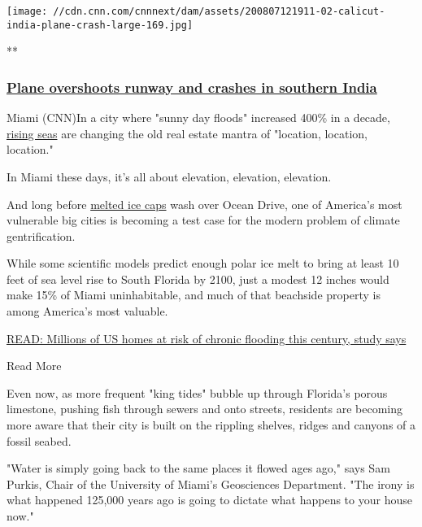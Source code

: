\href{/videos/world/2020/08/07/plane-crash-kozhikode-international-airport-air-india-express-vedika-sud-intl-vpx.cnn/video/playlists/top-news-videos/}{}

\texttt{[image: //cdn.cnn.com/cnnnext/dam/assets/200807121911-02-calicut-india-plane-crash-large-169.jpg]}

**

\hypertarget{plane-overshoots-runway-and-crashes-in-southern-india}{%
\subsubsection{\texorpdfstring{\href{/videos/world/2020/08/07/plane-crash-kozhikode-international-airport-air-india-express-vedika-sud-intl-vpx.cnn/video/playlists/top-news-videos/}{Plane
overshoots runway and crashes in southern
India}}{Plane overshoots runway and crashes in southern India}}\label{plane-overshoots-runway-and-crashes-in-southern-india}}

Miami (CNN)In a city where "sunny day floods" increased 400\% in a
decade,
\href{https://www.cnn.com/2018/06/18/us/sea-level-rise-ucs-projections-wxc/index.html}{rising
seas} are changing the old real estate mantra of "location, location,
location."

In Miami these days, it's all about elevation, elevation, elevation.

And long before
\href{http://www.cnn.com/2019/04/22/world/greenland-sea-level-rise-scn/index.html}{melted
ice caps} wash over Ocean Drive, one of America's most vulnerable big
cities is becoming a test case for the modern problem of climate
gentrification.

While some scientific models predict enough polar ice melt to bring at
least 10 feet of sea level rise to South Florida by 2100, just a modest
12 inches would make 15\% of Miami uninhabitable, and much of that
beachside property is among America's most valuable.

\href{https://www.cnn.com/2018/06/18/us/sea-level-rise-ucs-projections-wxc/index.html}{READ:
Millions of US homes at risk of chronic flooding this century, study
says}

Read More

Even now, as more frequent "king tides" bubble up through Florida's
porous limestone, pushing fish through sewers and onto streets,
residents are becoming more aware that their city is built on the
rippling shelves, ridges and canyons of a fossil seabed.

"Water is simply going back to the same places it flowed ages ago," says
Sam Purkis, Chair of the University of Miami's Geosciences Department.
"The irony is what happened 125,000 years ago is going to dictate what
happens to your house now."

